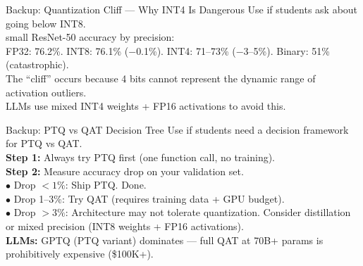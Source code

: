 \documentclass[aspectratio=169, 12pt]{beamer}
\begin{document}
\appendix

\begin{frame}{Backup: Quantization Cliff --- Why INT4 Is Dangerous}
\small
Use if students ask about going below INT8.\\small ResNet-50 accuracy by precision:\\ FP32: 76.2\%. INT8: 76.1\% ($-$0.1\%). INT4: 71--73\% ($-$3--5\%). Binary: 51\% (catastrophic).\\ The ``cliff'' occurs because 4 bits cannot represent the dynamic range of activation outliers.\\ LLMs use mixed INT4 weights + FP16 activations to avoid this.
\end{frame}

\begin{frame}{Backup: PTQ vs QAT Decision Tree}
\small
Use if students need a decision framework for PTQ vs QAT.\\[0.1cm]
{\footnotesize
\textbf{Step 1:} Always try PTQ first (one function call, no training).\\
\textbf{Step 2:} Measure accuracy drop on your validation set.\\
$\bullet$ Drop $< 1\%$: Ship PTQ. Done.\\
$\bullet$ Drop 1--3\%: Try QAT (requires training data + GPU budget).\\
$\bullet$ Drop $> 3\%$: Architecture may not tolerate quantization. Consider distillation or mixed precision (INT8 weights + FP16 activations).\\[0.05cm]
\textbf{LLMs:} GPTQ (PTQ variant) dominates --- full QAT at 70B+ params is prohibitively expensive (\$100K+).
}
\end{frame}
\end{document}
